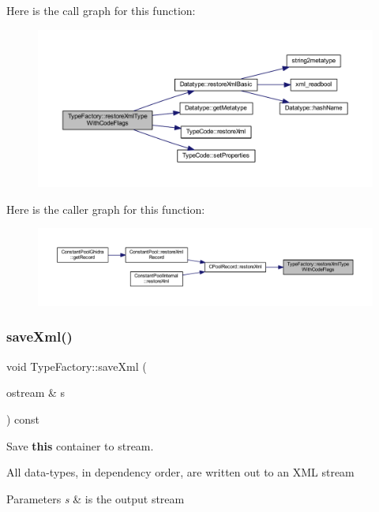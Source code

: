 Here is the call graph for this function\+:
\nopagebreak
\begin{figure}[H]
\begin{center}
\leavevmode
\includegraphics[width=350pt]{class_type_factory_a1b1dcb82c1c7493b55aae9b339e909c7_cgraph}
\end{center}
\end{figure}
Here is the caller graph for this function\+:
\nopagebreak
\begin{figure}[H]
\begin{center}
\leavevmode
\includegraphics[width=350pt]{class_type_factory_a1b1dcb82c1c7493b55aae9b339e909c7_icgraph}
\end{center}
\end{figure}
\mbox{\label{class_type_factory_adf9b9838cfe8166a236de6562f6dfcc3}} 
\subsubsection{\texorpdfstring{saveXml()}{saveXml()}}
{\footnotesize\ttfamily void Type\+Factory\+::save\+Xml (\begin{DoxyParamCaption}\item[{ostream \&}]{s }\end{DoxyParamCaption}) const}



Save {\bfseries{this}} container to stream. 

All data-\/types, in dependency order, are written out to an X\+ML stream 
\begin{DoxyParams}{Parameters}
{\em s} & is the output stream \\
\hline
\end{DoxyParams}


